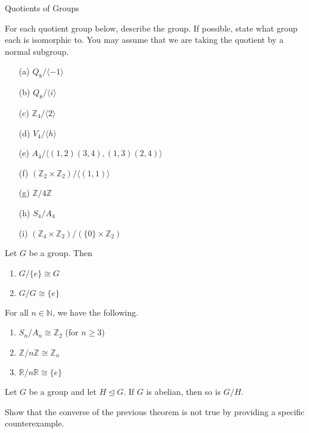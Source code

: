 \begin{section}{Quotients of Groups}
\begin{exercise}
\end{exercise}


\begin{exercise}
For each quotient group below, describe the group.  If possible, state what group each is isomorphic to.  You may assume that we are taking the quotient by a normal subgroup. 
\begin{enumerate}
\item[(a)] \(Q_8/\langle -1\rangle\)
\item[(b)] \(Q_8/\langle i\rangle\)
\item[(c)] \(\mathbb{Z}_4/\langle 2\rangle\)
\item[(d)] \(V_4/\langle h\rangle\)
\item[(e)] \(A_4/\langle (1,2)(3,4),(1,3)(2,4)\rangle\)
\item[(f)] \((\mathbb{Z}_2\times \mathbb{Z}_2)/\langle (1,1)\rangle\)
\item[(g)] \(\mathbb{Z}/4\mathbb{Z}\)
\item[(h)] \(S_4/A_4\)
\item[(i)] \((\mathbb{Z}_4\times \mathbb{Z}_2)/(\{0\}\times \mathbb{Z}_2)\)
\end{enumerate}
\end{exercise}

\begin{theorem}
Let \(G\) be a group.  Then
\begin{enumerate}
\item \(G/\{e\}\cong G\)
\item \(G/G\cong \{e\}\)
\end{enumerate}
\end{theorem}

\begin{theorem}
For all \(n\in \mathbb{N}\), we have the following.
\begin{enumerate}
\item \(S_n/A_n\cong \mathbb{Z}_2\) (for \(n\geq 3\))
\item \(\mathbb{Z}/n\mathbb{Z}\cong \mathbb{Z}_n\)
\item \(\mathbb{R}/n\mathbb{R}\cong \{e\}\)
\end{enumerate}
\end{theorem}

\begin{theorem}
Let \(G\) be a group and let \(H\trianglelefteq G\).  If \(G\) is abelian, then so is \(G/H\).
\end{theorem}

\begin{problem}
Show that the converse of the previous theorem is not true by providing a specific counterexample.
\end{problem}


\end{section}
